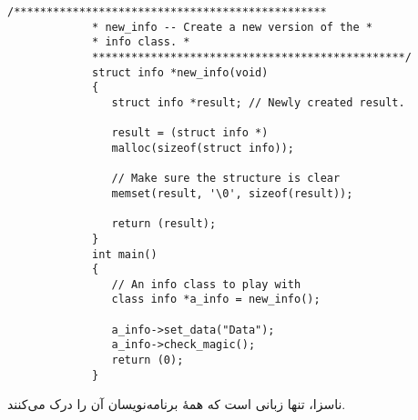 \begin{LTR}
\begin{lstlisting}[style=C++Style]
             /************************************************
             * new_info -- Create a new version of the *
             * info class. *
             ************************************************/
             struct info *new_info(void)
             {
             	struct info *result; // Newly created result.

             	result = (struct info *)
             	malloc(sizeof(struct info));

             	// Make sure the structure is clear
             	memset(result, '\0', sizeof(result));

             	return (result);
             }
             int main()
             {
             	// An info class to play with
             	class info *a_info = new_info();

             	a_info->set_data("Data");
             	a_info->check_magic();
             	return (0);
             }
        \end{lstlisting}
\end{LTR}

\begin{tcolorbox}
    ناسزا، تنها زبانی است که همهٔ برنامه‌نویسان آن را درک می‌کنند.
\end{tcolorbox}